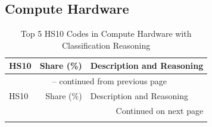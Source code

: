 
\subsection{Compute Hardware}

\begin{longtable}{lrp{12cm}}
\caption{Top 5 HS10 Codes in Compute Hardware with Classification Reasoning}\\
\toprule
HS10 & Share (\%) & Description and Reasoning \\
\midrule
\endfirsthead

\multicolumn{3}{c}{{\tablename\ \thetable{} -- continued from previous page}} \\
\toprule
HS10 & Share (\%) & Description and Reasoning \\
\midrule
\endhead

\midrule
\multicolumn{3}{r}{{Continued on next page}} \\
\endfoot

\bottomrule
\endlastfoot


\end{longtable}
